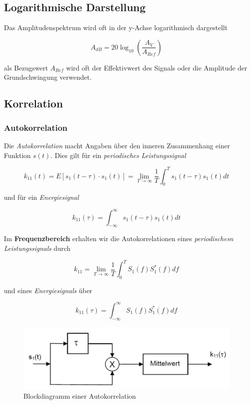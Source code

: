 \documentclass[
  10pt,
  a4paper,
  german]{article}
\numberwithin{equation}{section}
\begin{document}
\hypertarget{logarithmische-darstellung}{%
\subsection{Logarithmische
Darstellung}\label{logarithmische-darstellung}}

Das Amplitudenspektrum wird oft in der y-Achse logarithmisch dargestellt

\[
A_{dB}=20\log_{10}\left(\frac{A_{V}}{A_{Ref}}\right)
\]

als Bezugswert \(A_{Ref}\) wird oft der Effektivwert des Signals oder
die Amplitude der Grundschwingung verwendet.

\hypertarget{korrelation}{%
\subsection{Korrelation}\label{korrelation}}

\hypertarget{autokorrelation}{%
\subsubsection{Autokorrelation}\label{autokorrelation}}

Die \emph{Autokorrelation} macht Angaben über den inneren Zusammenhang
einer Funktion \(s(t)\). Dies gilt für ein \emph{periodisches
Leistungssignal}

\[
k_{11}(t)=E[s_1(t-\tau)\cdot s_1(t)]=\lim_{T\rightarrow \infty}{\frac{1}{T}\int_0^T{s_1(t-\tau)s_1(t)dt}}
\]

und für ein \emph{Energiesignal}

\[
k_{11}(\tau)=\int_{-\infty}^{\infty}{s_1(t-\tau)s_1(t)dt}
\]

Im \textbf{Frequenzbereich} erhalten wir die Autokorrelationen eines
\emph{periodischesn Leistungssignals} durch

\[
k_{11}=\lim_{T\rightarrow\infty}{\frac{1}{T}\int_0^T{S_1(f)S_1^*(f)df}}
\]

und eines \emph{Energiesignals} über

\[
k_{11}(\tau)=\int_{-\infty}^{\infty}{S_1(f)S_1^*(f)df}
\]

\begin{figure}[H]

{\centering \includegraphics{images/02_Autokorrelation.png}

}

\caption{Blockdiagramm einer Autokorrelation}

\end{figure}
\end{document}

